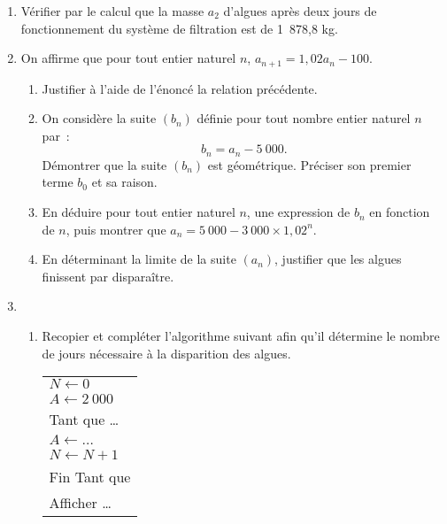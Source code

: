 \begin{enumerate}
     \item Vérifier par le calcul que la masse $a_2$ d'algues après deux jours de
     fonctionnement du système de filtration est de 1~878,8 kg.
     \item On affirme que pour tout entier naturel $n$,\: $a_{n+1} = 1,02a_n - 100$.
     \begin{enumerate}[label=\alph*.]
          \item Justifier à l'aide de l'énoncé la relation précédente.
          \item  On considère la suite $\left(b_n\right)$ définie pour tout nombre entier naturel $n$ par~:
         \[b_n = a_n - 5~000.\]
          Démontrer que la suite $\left(b_n\right)$ est géométrique. Préciser son premier terme
          $b_0$ et sa raison.
          \item  En déduire pour tout entier naturel $n$, une expression de $b_n$ en fonction de
          $n$, puis montrer que $a_n = 5~000 - 3~000 \times 1,02^n$.
          \item  En déterminant la limite de la suite $\left(a_n\right)$, justifier que les algues finissent
          par disparaître.
     \end{enumerate}
     \item
     \begin{enumerate}[label=\alph*.]
          \item Recopier et compléter l'algorithme suivant afin qu'il détermine le nombre
          de jours nécessaire à la disparition des algues.
          \begin{center}
               \begin{extern}%
                    \begin{tabularx}{0.25\linewidth}{|X|}\hline
                         $N \gets 0$\\
                         $A \gets 2~000$\\
                         Tant que \ldots\\
                         \hspace{1cm}$A \gets \ldots$\\
                         \hspace{1cm}$N \gets N + 1$\\
                         Fin Tant que\\
                         Afficher \ldots\\ \hline

\end{tabularx}
\end{extern}
\end{center}
\end{enumerate}
\end{enumerate}
